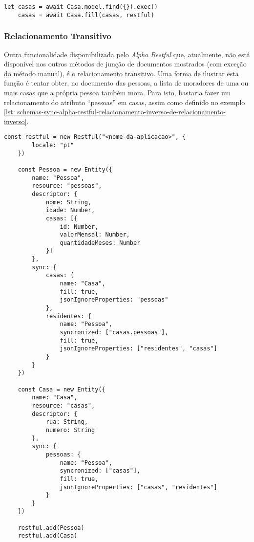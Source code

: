 \begin{lstlisting}[style=ES6, caption={Junção Com o \textit{Alpha Restful} em Relacionamento Inverso\label{lst: resultado-juncao-schemas-sync-alpha-restful-relacionamento-inverso}}]
	let casas = await Casa.model.find({}).exec()
	casas = await Casa.fill(casas, restful)
\end{lstlisting}

\subsubsection{Relacionamento Transitivo}

Outra funcionalidade disponibilizada pelo \textit{Alpha Restful} que, atualmente, não está disponível nos outros métodos de junção de documentos mostrados (com exceção do método manual), é o relacionamento transitivo. Uma forma de ilustrar esta função é tentar obter, no documento das pessoas, a lista de moradores de uma ou mais casas que a própria pessoa também mora. Para isto, bastaria fazer um relacionamento do atributo ``pessoas'' em casas, assim como definido no exemplo \ref{lst: schemas-sync-alpha-restful-relacionamento-inverso-de-relacionamento-inverso}.

\begin{lstlisting}[style=ES6, caption={Relacionamento Inverso de Relacionamento Inverso \label{lst: schemas-sync-alpha-restful-relacionamento-inverso-de-relacionamento-inverso}}]
    const restful = new Restful("<nome-da-aplicacao>", {
        locale: "pt"
    })

    const Pessoa = new Entity({
        name: "Pessoa",
        resource: "pessoas",
        descriptor: {
            nome: String,
            idade: Number,
            casas: [{
                id: Number,
                valorMensal: Number,
                quantidadeMeses: Number
            }]
        },
        sync: {
            casas: {
                name: "Casa",
                fill: true,
                jsonIgnoreProperties: "pessoas"
            },
            residentes: {
                name: "Pessoa",
                syncronized: ["casas.pessoas"],
                fill: true,
                jsonIgnoreProperties: ["residentes", "casas"]
            }
        }
    })
    
    const Casa = new Entity({
        name: "Casa",
        resource: "casas",
        descriptor: {
            rua: String,
            numero: String
        },
        sync: {
            pessoas: {
                name: "Pessoa",
                syncronized: ["casas"],
                fill: true,
                jsonIgnoreProperties: ["casas", "residentes"]
            }
        }
    })
    
    restful.add(Pessoa)
    restful.add(Casa)
\end{lstlisting}

